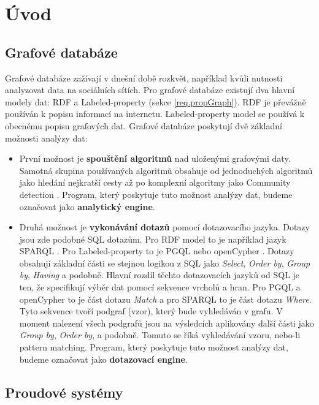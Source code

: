 \chapter*{Úvod}

\section*{Grafové databáze}

Grafové databáze zažívají v dnešní době rozkvět, například kvůli nutnosti analyzovat data na sociálních sítích.
Pro grafové databáze existují dva hlavní modely dat: RDF \citep{rdf} a Labeled-property (sekce \ref{req.propGraph}).
RDF je převážně používán k popisu informací na internetu. 
Labeled-property model se používá k obecnému popisu grafových dat.
Grafové databáze poskytují dvě základní možnosti analýzy dat:
\begin{itemize}
\item
První možnost je \textbf{spouštění algoritmů} nad uloženými grafovými daty.
Samotná skupina používaných algoritmů obsahuje od jednoduchých algoritmů jako hledání nejkratší cesty až po komplexní algoritmy jako Community detection \citep[str. 115]{graphAlg}.
Program, který poskytuje tuto možnost analýzy dat, budeme označovat jako \textbf{analytický engine}.
\item
Druhá možnost je \textbf{vykonávání dotazů} pomocí dotazovacího jazyka.
Dotazy jsou zde podobné SQL dotazům.
Pro RDF model to je například jazyk SPARQL \citep{sparql}.
Pro Labeled-property to je PGQL \citep{pgql} nebo openCypher \citep{openCypher}.
Dotazy obsahují základní části se stejnou logikou z SQL jako \textit{Select}, \textit{Order by}, \textit{Group by}, \textit{Having} a podobně.
Hlavní rozdíl těchto dotazovacích jazyků od SQL je ten, že specifikují výběr dat pomocí sekvence vrcholů a hran.
Pro PGQL a openCypher to je část dotazu \textit{Match} a pro SPARQL to je část dotazu \textit{Where}.
Tyto sekvence tvoří podgraf (vzor), který bude vyhledáván v grafu.
V moment nalezení všech podgrafů jsou na výsledcích aplikovány další části jako \textit{Group by}, \textit{Order by}, a podobně.
Tomuto se říká vyhledávání vzoru, nebo-li pattern matching.
Program, který poskytuje tuto možnost analýzy dat, budeme označovat jako \textbf{dotazovací engine}.
\end{itemize}

\section*{Proudové systémy}

